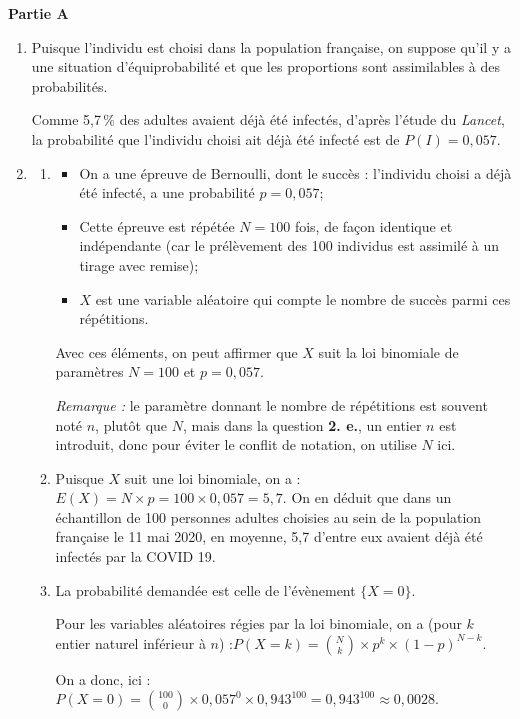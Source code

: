 \medskip
\textbf{Partie A}
\medskip
\begin{enumerate}
	\item Puisque l'individu est choisi dans la population française, on suppose qu'il y a une situation d'équiprobabilité et que les proportions sont assimilables à des probabilités.

Comme 5,7\,\% des adultes avaient déjà été infectés, d'après l'étude du \emph{Lancet}, la probabilité que l'individu choisi ait déjà été infecté est de $P(I) = 0,057$.

	\item \begin{enumerate}
		\item \begin{itemize}
			\item On a une épreuve de Bernoulli, dont le succès : \og l'individu choisi a déjà été infecté\fg{}, a une probabilité $p = 0,057$;
			\item Cette épreuve est répétée $N = 100$ fois, de façon identique et indépendante (car le prélèvement des 100 individus est assimilé à un tirage avec remise);
			\item $X$ est une variable aléatoire qui compte le nombre de succès parmi ces répétitions.
		\end{itemize}

		Avec ces éléments, on peut affirmer que $X$ suit la loi binomiale de paramètres $N = 100$ et $p = 0,057$.

		\emph{Remarque :} le paramètre donnant le nombre de répétitions est souvent noté $n$, plutôt que $N$, mais dans la question \textbf{2. e.}, un entier $n$ est introduit, donc pour éviter le conflit de notation, on utilise $N$ ici.

		\item Puisque $X$ suit une loi binomiale, on a :\quad $E(X) = N\times p = 100\times 0,057 = 5,7$. On en déduit que dans un échantillon de 100 personnes adultes choisies au sein de la population française le  11 mai 2020, en moyenne, 5,7 d'entre eux avaient déjà été infectés par la COVID 19.

		\item La probabilité demandée est celle de l'évènement $\{X = 0\}$.

Pour les variables aléatoires régies par la loi binomiale, on a (pour $k$ entier naturel inférieur à $n$) :\quad $P(X = k) = \displaystyle \binom{N}{k} \times p^k \times (1 - p)^{N-k}$.

On a donc, ici : \quad $P(X = 0) = \displaystyle \binom{100}{0 }\times 0,057^0 \times 0,943^{100} = 0,943^{100} \approx 0,0028$.


\end{enumerate}
\end{enumerate}
